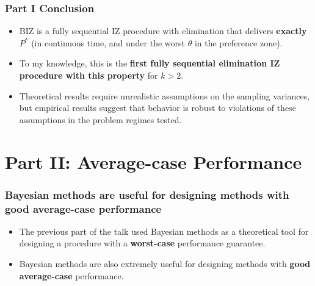 \documentclass[13pt]{beamer}
\newcommand{\figdir}{../../fig}
\begin{document}



\begin{frame}
\frametitle{Part I Conclusion}
\begin{itemize}
  \item BIZ is a fully sequential IZ procedure with elimination that delivers {\bf exactly} $P^*$ (in continuous time, and under the worst $\theta$ in the preference zone).
  \item To my knowledge, this is the {\bf first fully sequential elimination IZ procedure with this property} for $k>2$.
  \item Theoretical results require unrealistic assumptions on the sampling variances, but empirical results suggest that behavior is robust to violations of these assumptions in the problem regimes tested.
\end{itemize}
\end{frame}


\section{Part II: Average-case Performance}
\begin{frame}
  \frametitle{Bayesian methods are useful for designing methods with good average-case performance}
  \begin{itemize}
    \item The previous part of the talk used Bayesian methods as a theoretical tool for designing a procedure with a {\bf worst-case} performance guarantee.
    \item Bayesian methods are also extremely useful for designing methods with {\bf good average-case} performance. 
  \end{itemize}
\end{frame}
\end{document}
